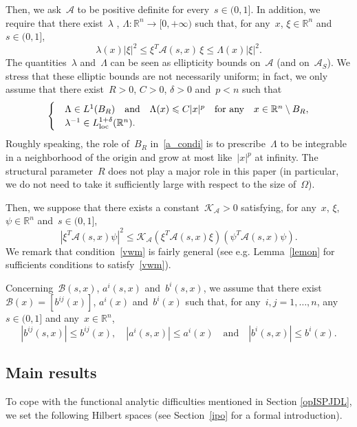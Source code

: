 \documentclass[11pt,hyp,]{nyjm}
\numberwithin{equation}{section}
\newcommand{\R}{\mathbb{R}}
\theoremstyle{remark}
\newcommand{\am}{\mathcal{A}}
\renewcommand{\leq}{\leqslant}
\begin{document}
Then, we ask~$\mathcal{A}$ to be positive definite for every~$s \in (0,1]$. In addition, we require that there exist~$\lambda$ , $\Lambda:\R^n\to[0,+\infty)$ such that, for any~$x$, $\xi \in \R^n$ and~$s \in (0,1]$, 
\begin{equation}\label{essa}
\lambda(x) |\xi|^2 \leq \xi^T \mathcal{A} (s,x)\,\xi \leq \Lambda(x) |\xi|^2.
\end{equation}
The quantities~$\lambda$ and~$\Lambda$ can be seen as
ellipticity bounds on~$\mathcal{A}$ (and on~$\mathcal{A}_S$). We stress that these elliptic bounds are not necessarily uniform; in fact, we only assume that there exist~$R>0$, $C>0$, $\delta>0$ and~$p<n$ such that
\begin{equation}\label{a_condi}
\begin{cases}
&\Lambda \in L^1(B_R) \quad\mbox{and}\quad \Lambda(x) \leq C |x|^{p} \quad\mbox{for any}\quad x \in \R^n \setminus B_R, \\
&\lambda^{-1}\in L^{1+\delta}_{{\rm{loc}}}(\R^n).
\end{cases}
\end{equation}  
Roughly speaking, the role of~$B_R$ in~\eqref{a_condi}
is to prescribe~$\Lambda$ to be
integrable in a neighborhood of the origin and grow at most like~$|x|^p$ at infinity. The structural
parameter~$R$ does not play a major role in this paper (in particular, we do not
need to take it sufficiently large with respect to the size of~$\Omega$).

Then, we suppose that there exists a constant~$\mathcal{K}_{\am}>0$ satisfying, for any~$x$, $\xi$, $\psi \in \R^n$ and~$s \in (0,1]$,
			\begin{equation}\label{vwm}
				\left|\xi^T \mathcal{A}(s,x) \psi\right|^2 \leq \mathcal{K}_{\am} (\xi^T \mathcal{A}(s,x)\xi)(\psi^T \mathcal{A}(s,x) \psi).
			\end{equation}
We remark that condition~\eqref{vwm} is fairly general (see e.g.
Lemma~\ref{lemon} for sufficients conditions to satisfy~\eqref{vwm}).


Concerning~$\mathcal{B}(s,x)$, $a^i(s,x)$ and~$b^i(s,x)$, we assume that there exist~$\mathcal{B}(x)=[b^{ij}(x)]$, $a^i(x)$ and~$b^i(x)$ such that, for any~$i,j=1,\ldots,n$, any~$s \in (0,1]$ and any~$x \in \R^n$, 
\begin{equation}\label{fds}
|b^{ij}(s,x)|\leq b^{ij}(x), \quad |a^i(s,x)| \leq a^i(x) \quad\mbox{and}\quad |b^i(s,x)| \leq b^i(x).
\end{equation}


\subsection{Main results}
To cope with the functional analytic difficulties mentioned in Section \ref{opISPJDL}, we set the following Hilbert spaces (see Section~\ref{ipo} for a formal introduction). 
\end{document}
